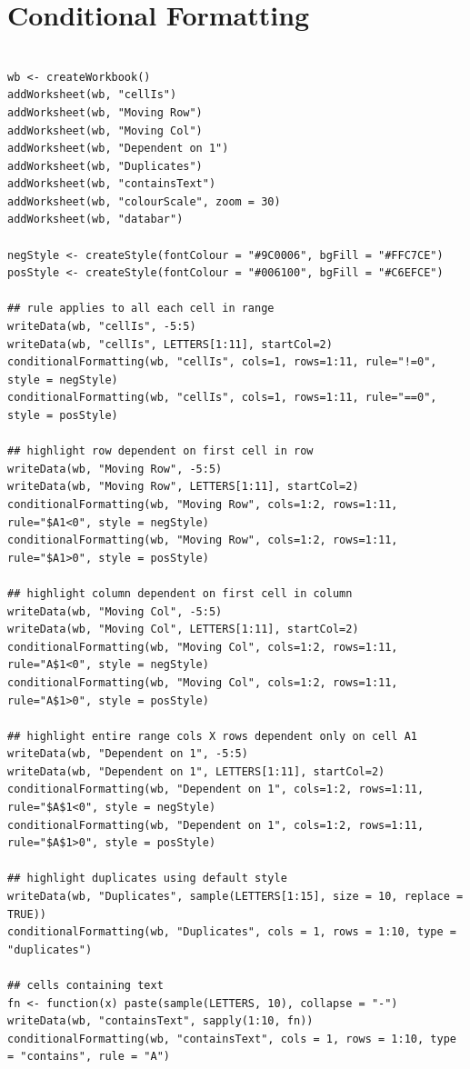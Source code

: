 \documentclass[11pt]{article}\usepackage[]{graphicx}\usepackage[]{color}
\begin{document}
\newpage
\section{Conditional Formatting}
\begin{verbatim}

wb <- createWorkbook()
addWorksheet(wb, "cellIs")
addWorksheet(wb, "Moving Row")
addWorksheet(wb, "Moving Col")
addWorksheet(wb, "Dependent on 1")
addWorksheet(wb, "Duplicates")
addWorksheet(wb, "containsText")
addWorksheet(wb, "colourScale", zoom = 30)
addWorksheet(wb, "databar")

negStyle <- createStyle(fontColour = "#9C0006", bgFill = "#FFC7CE")
posStyle <- createStyle(fontColour = "#006100", bgFill = "#C6EFCE")

## rule applies to all each cell in range
writeData(wb, "cellIs", -5:5)
writeData(wb, "cellIs", LETTERS[1:11], startCol=2)
conditionalFormatting(wb, "cellIs", cols=1, rows=1:11, rule="!=0", style = negStyle)
conditionalFormatting(wb, "cellIs", cols=1, rows=1:11, rule="==0", style = posStyle)

## highlight row dependent on first cell in row
writeData(wb, "Moving Row", -5:5)
writeData(wb, "Moving Row", LETTERS[1:11], startCol=2)
conditionalFormatting(wb, "Moving Row", cols=1:2, rows=1:11, rule="$A1<0", style = negStyle)
conditionalFormatting(wb, "Moving Row", cols=1:2, rows=1:11, rule="$A1>0", style = posStyle)

## highlight column dependent on first cell in column
writeData(wb, "Moving Col", -5:5)
writeData(wb, "Moving Col", LETTERS[1:11], startCol=2)
conditionalFormatting(wb, "Moving Col", cols=1:2, rows=1:11, rule="A$1<0", style = negStyle)
conditionalFormatting(wb, "Moving Col", cols=1:2, rows=1:11, rule="A$1>0", style = posStyle)

## highlight entire range cols X rows dependent only on cell A1
writeData(wb, "Dependent on 1", -5:5)
writeData(wb, "Dependent on 1", LETTERS[1:11], startCol=2)
conditionalFormatting(wb, "Dependent on 1", cols=1:2, rows=1:11, rule="$A$1<0", style = negStyle)
conditionalFormatting(wb, "Dependent on 1", cols=1:2, rows=1:11, rule="$A$1>0", style = posStyle)

## highlight duplicates using default style
writeData(wb, "Duplicates", sample(LETTERS[1:15], size = 10, replace = TRUE))
conditionalFormatting(wb, "Duplicates", cols = 1, rows = 1:10, type = "duplicates")

## cells containing text
fn <- function(x) paste(sample(LETTERS, 10), collapse = "-")
writeData(wb, "containsText", sapply(1:10, fn))
conditionalFormatting(wb, "containsText", cols = 1, rows = 1:10, type = "contains", rule = "A")


\end{verbatim}
\end{document}
